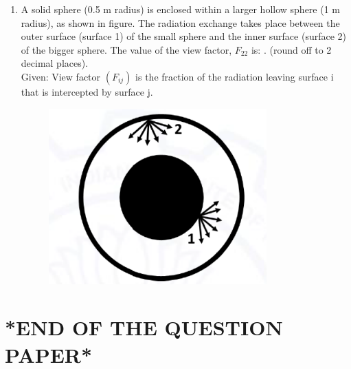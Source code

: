 \documentclass[journal]{IEEEtran}
\theoremstyle{remark}
\begin{document}
\begin{enumerate}[resume]
\item A solid sphere (0.5 m radius) is enclosed within a larger hollow sphere (1 m
radius), as shown in figure. The radiation exchange takes place between the
outer surface (surface 1) of the small sphere and the inner surface (surface
2) of the bigger sphere. The value of the view factor, $F_{22}$ is:  \underline {\hspace{2cm}}. (round off to 2 decimal places). \hfill{}\\
Given: View factor $(F_{ij})$ is the fraction of the radiation leaving surface i
that is intercepted by surface j.
\begin{figure}[H]
    \centering
    \includegraphics[width=0.5\columnwidth]{figs/Q.55.png}
    \caption{}
    \label{fig:placeholder}
\end{figure}

\end{enumerate}
\section*{*END OF THE QUESTION PAPER*}
 
\end{document}
